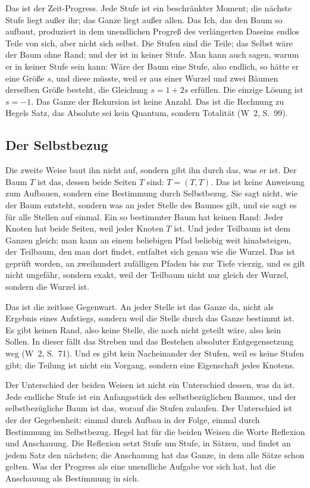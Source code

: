 \documentclass[11pt,a4paper]{article}
\newcommand{\Werke}[1]{(W~2, S.~#1)}
\begin{document}
Das ist der Zeit-Progress. Jede Stufe ist ein beschränkter Moment; die nächste Stufe liegt außer ihr; das Ganze liegt außer allen. Das Ich, das den Baum so aufbaut, \glqq produziert in dem unendlichen Progreß des verlängerten Daseins endlos Teile von sich, aber nicht sich selbst\grqq{}. Die Stufen sind die Teile; das Selbst wäre der Baum ohne Rand; und der ist in keiner Stufe. Man kann auch sagen, warum er in keiner Stufe sein kann: Wäre der Baum eine Stufe, also endlich, so hätte er eine Größe $s$, und diese müsste, weil er aus einer Wurzel und zwei Bäumen derselben Größe besteht, die Gleichung $s = 1 + 2s$ erfüllen. Die einzige Lösung ist $s = -1$. Das Ganze der Rekursion ist keine Anzahl. Das ist die Rechnung zu Hegels Satz, das Absolute sei \glqq kein Quantum, sondern Totalität\grqq{} \Werke{99}.

\subsection{Der Selbstbezug}

Die zweite Weise baut ihn nicht auf, sondern gibt ihn durch das, was er ist. Der Baum $T$ ist das, dessen beide Seiten $T$ sind: $T = (T, T)$. Das ist keine Anweisung zum Aufbauen, sondern eine Bestimmung durch Selbstbezug. Sie sagt nicht, wie der Baum entsteht, sondern was an jeder Stelle des Baumes gilt, und sie sagt es für alle Stellen auf einmal. Ein so bestimmter Baum hat keinen Rand: Jeder Knoten hat beide Seiten, weil jeder Knoten $T$ ist. Und jeder Teilbaum ist dem Ganzen gleich; man kann an einem beliebigen Pfad beliebig weit hinabsteigen, der Teilbaum, den man dort findet, entfaltet sich genau wie die Wurzel. Das ist geprüft worden, an zweihundert zufälligen Pfaden bis zur Tiefe vierzig, und es gilt nicht ungefähr, sondern exakt, weil der Teilbaum nicht nur gleich der Wurzel, sondern die Wurzel ist.

Das ist die zeitlose Gegenwart. An jeder Stelle ist das Ganze da, nicht als Ergebnis eines Aufstiegs, sondern weil die Stelle durch das Ganze bestimmt ist. Es gibt keinen Rand, also keine Stelle, die noch nicht geteilt wäre, also kein Sollen. \glqq In dieser fällt das Streben und das Bestehen absoluter Entgegensetzung weg\grqq{} \Werke{71}. Und es gibt kein Nacheinander der Stufen, weil es keine Stufen gibt; die Teilung ist nicht ein Vorgang, sondern eine Eigenschaft jedes Knotens.

Der Unterschied der beiden Weisen ist nicht ein Unterschied dessen, was da ist. Jede endliche Stufe ist ein Anfangsstück des selbstbezüglichen Baumes, und der selbstbezügliche Baum ist das, worauf die Stufen zulaufen. Der Unterschied ist der der Gegebenheit: einmal durch Aufbau in der Folge, einmal durch Bestimmung im Selbstbezug. Hegel hat für die beiden Weisen die Worte Reflexion und Anschauung. Die Reflexion setzt Stufe um Stufe, in Sätzen, und findet an jedem Satz den nächsten; die Anschauung hat das Ganze, in dem alle Sätze schon gelten. Was der Progress als eine unendliche Aufgabe vor sich hat, hat die Anschauung als Bestimmung in sich.
\end{document}
